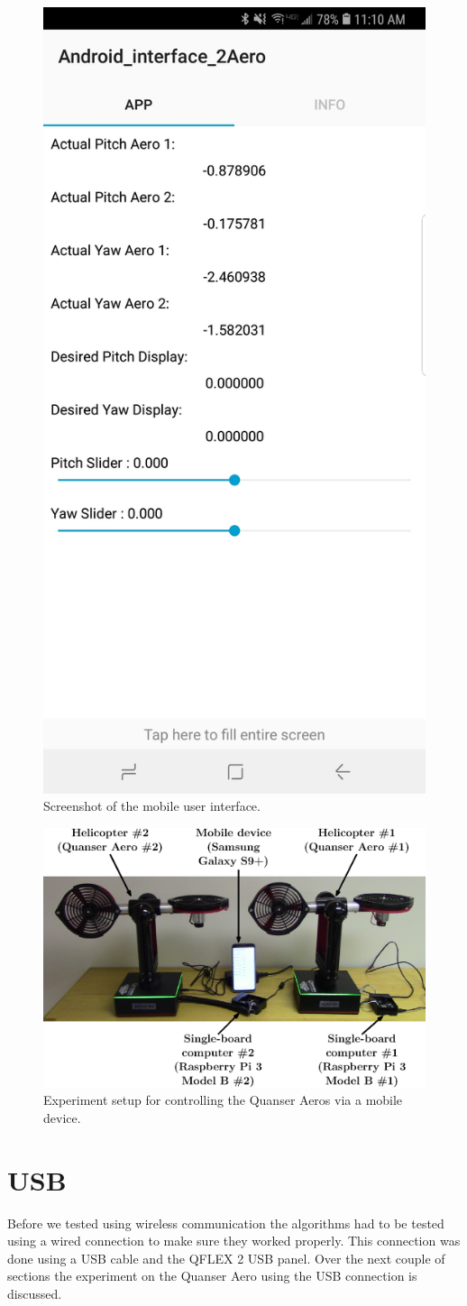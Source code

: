 \begin{figure}[!htbp]
    \centering
    \includegraphics[width=.46\textwidth,keepaspectratio=true]{figs/img/Screenshot_Android_Interface_2Aero}
    \caption{Screenshot of the mobile user interface.}
    \label{fig:Screenshot_Android_Interface}
\end{figure}

\begin{figure}[!htbp]
    \centering
    \includegraphics[width=.5\textwidth,keepaspectratio=true]{figs/ipe/Setup.eps}
    \caption{Experiment setup for controlling the Quanser Aeros via a mobile device.}
    \label{fig:Setup}
\end{figure}

\section{USB}
Before we tested using wireless communication the algorithms had to be tested using a wired connection to make sure they worked properly.  This connection was done using a USB cable and the QFLEX 2 USB panel.  Over the next couple of sections the experiment on the Quanser Aero using the USB connection is discussed.
